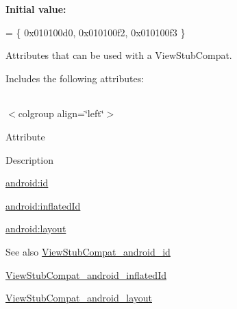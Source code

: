 {\bfseries Initial value\+:}
\begin{DoxyCode}
= \{
            0x010100d0, 0x010100f2, 0x010100f3
        \}
\end{DoxyCode}
Attributes that can be used with a View\+Stub\+Compat. 

Includes the following attributes\+:

\tabulinesep=1mm
\begin{longtabu} spread 0pt [c]{*{0}{|X[-1]}|}
\hline
\end{longtabu}
$<$colgroup align=\char`\"{}left\char`\"{}$>$ 

Attribute

Description 

{\ttfamily \hyperlink{classandroid_1_1support_1_1v7_1_1mediarouter_1_1R_1_1styleable_a3719fa2d9310287811d6fec60694b692}{android\+:id}}

{\ttfamily \hyperlink{classandroid_1_1support_1_1v7_1_1mediarouter_1_1R_1_1styleable_a1dfd76827a9d1ef07e8512ba9ebf5ad0}{android\+:inflated\+Id}}

{\ttfamily \hyperlink{classandroid_1_1support_1_1v7_1_1mediarouter_1_1R_1_1styleable_aa773bc500a7a8b41812f2da8e40497f6}{android\+:layout}}

\begin{DoxySeeAlso}{See also}
\hyperlink{classandroid_1_1support_1_1v7_1_1mediarouter_1_1R_1_1styleable_a3719fa2d9310287811d6fec60694b692}{View\+Stub\+Compat\+\_\+android\+\_\+id} 

\hyperlink{classandroid_1_1support_1_1v7_1_1mediarouter_1_1R_1_1styleable_a1dfd76827a9d1ef07e8512ba9ebf5ad0}{View\+Stub\+Compat\+\_\+android\+\_\+inflated\+Id} 

\hyperlink{classandroid_1_1support_1_1v7_1_1mediarouter_1_1R_1_1styleable_aa773bc500a7a8b41812f2da8e40497f6}{View\+Stub\+Compat\+\_\+android\+\_\+layout} 
\end{DoxySeeAlso}
\mbox{\label{classandroid_1_1support_1_1v7_1_1mediarouter_1_1R_1_1styleable_a3719fa2d9310287811d6fec60694b692}} 
